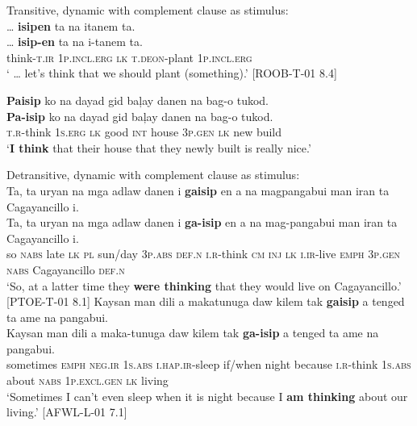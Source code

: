 \ea
Transitive, dynamic with complement clause as stimulus: \\
 … \textbf{isipen}  ta  na  itanem  ta. \\\smallskip
\gll  … \textbf{isip-en}  ta  na  i-tanem  ta. \\
{} think-\textsc{t.ir}  1\textsc{p.incl.erg}  \textsc{lk}  \textsc{t.deon}-plant  1\textsc{p.incl.erg} \\
\glt ‘ … let’s think that we should plant (something).’ [ROOB-T-01 8.4]
\z

\ea
\textbf{Paisip}  ko  na  dayad  gid  baļay  danen  na  bag-o  tukod. \\\smallskip
\gll \textbf{Pa-isip}  ko  na  dayad  gid  baļay  danen  na  bag-o  tukod. \\
\textsc{t.r}-think  1\textsc{s.erg}  \textsc{lk}  good  \textsc{int}  house  3\textsc{p.gen}  \textsc{lk}  new  build \\
\glt ‘\textbf{I think} that their house that they newly built is really nice.’
\z

\ea
Detransitive, dynamic with complement clause as stimulus: \\
Ta,  ta  uryan  na  mga  adlaw  danen  i  \textbf{gaisip}  en  a  na magpangabui  man  iran  ta  Cagayancillo  i. \\\smallskip
\gll Ta,  ta  uryan  na  mga  adlaw  danen  i  \textbf{ga-isip}  en  a  na mag-pangabui  man  iran  ta  Cagayancillo  i. \\
so  \textsc{nabs}  late  \textsc{lk}  \textsc{pl}  sun/day  3\textsc{p.abs}  \textsc{def.n}  \textsc{i.r}-think  \textsc{cm}  \textsc{inj}  \textsc{lk}
\textsc{i.ir}-live  \textsc{emph}  3\textsc{p.gen}  \textsc{nabs}  Cagayancillo  \textsc{def.n} \\
\glt `So, at a latter time they \textbf{were thinking} that they would live on Cagayancillo.’ [PTOE-T-01 8.1]
\z
\ea
Kaysan  man  dili  a  makatunuga  daw  kilem tak  \textbf{gaisip}  a  tenged  ta  ame  na  pangabui. \\\smallskip
\gll Kaysan  man  dili  a  maka-tunuga  daw  kilem tak  \textbf{ga-isip}  a  tenged  ta  ame  na  pangabui. \\
sometimes  \textsc{emph}  \textsc{neg.ir}  1\textsc{s.abs}  \textsc{i.hap.ir}-sleep  if/when  night
because  \textsc{i.r}-think  1\textsc{s.abs}  about  \textsc{nabs}  1\textsc{p.excl.gen}  \textsc{lk}  living \\
\glt `Sometimes I can’t even sleep when it is night because I \textbf{am thinking} about our living.’ [AFWL-L-01 7.1]
\z

